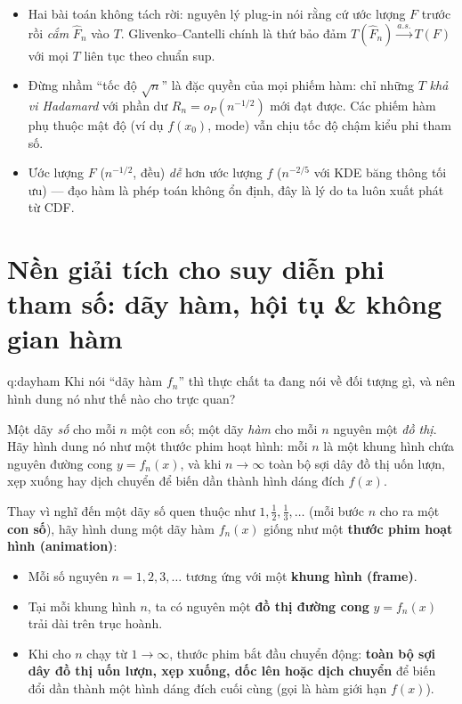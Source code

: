 \begin{luuy}
\begin{itemize}
\item Hai bài toán không tách rời: nguyên lý plug-in nói rằng cứ ước lượng $F$ trước rồi \emph{cắm} $\widehat F_n$ vào $T$. Glivenko--Cantelli chính là thứ bảo đảm $T(\widehat F_n)\xrightarrow{a.s.}T(F)$ với mọi $T$ liên tục theo chuẩn sup.
\item Đừng nhầm ``tốc độ $\sqrt{n}$'' là đặc quyền của mọi phiếm hàm: chỉ những $T$ \emph{khả vi Hadamard} với phần dư $R_n=o_P(n^{-1/2})$ mới đạt được. Các phiếm hàm phụ thuộc mật độ (ví dụ $f(x_0)$, mode) vẫn chịu tốc độ chậm kiểu phi tham số.
\item Ước lượng $F$ ($n^{-1/2}$, đều) \emph{dễ} hơn ước lượng $f$ ($n^{-2/5}$ với KDE băng thông tối ưu) --- đạo hàm là phép toán không ổn định, đây là lý do ta luôn xuất phát từ CDF.
\end{itemize}
\end{luuy}


\section{Nền giải tích cho suy diễn phi tham số: dãy hàm, hội tụ \& không gian hàm}

\begin{cauhoi}{q:dayham}
Khi nói ``dãy hàm $f_n$'' thì thực chất ta đang nói về đối tượng gì, và nên hình dung nó như thế nào cho trực quan?
\end{cauhoi}

\begin{chot}
Một dãy \emph{số} cho mỗi $n$ một con số; một dãy \emph{hàm} cho mỗi $n$ nguyên một \emph{đồ thị}. Hãy hình dung nó như một thước phim hoạt hình: mỗi $n$ là một khung hình chứa nguyên đường cong $y=f_n(x)$, và khi $n\to\infty$ toàn bộ sợi dây đồ thị uốn lượn, xẹp xuống hay dịch chuyển để biến dần thành hình dáng đích $f(x)$.
\end{chot}

Thay vì nghĩ đến một dãy số quen thuộc như $1,\frac12,\frac13,\dots$ (mỗi bước $n$ cho ra một \textbf{con số}), hãy hình dung một dãy hàm $f_n(x)$ giống như một \textbf{thước phim hoạt hình (animation)}:
\begin{itemize}
\item Mỗi số nguyên $n=1,2,3,\dots$ tương ứng với một \textbf{khung hình (frame)}.
\item Tại mỗi khung hình $n$, ta có nguyên một \textbf{đồ thị đường cong} $y=f_n(x)$ trải dài trên trục hoành.
\item Khi cho $n$ chạy từ $1\to\infty$, thước phim bắt đầu chuyển động: \textbf{toàn bộ sợi dây đồ thị uốn lượn, xẹp xuống, dốc lên hoặc dịch chuyển} để biến đổi dần thành một hình dáng đích cuối cùng (gọi là hàm giới hạn $f(x)$).
\end{itemize}

